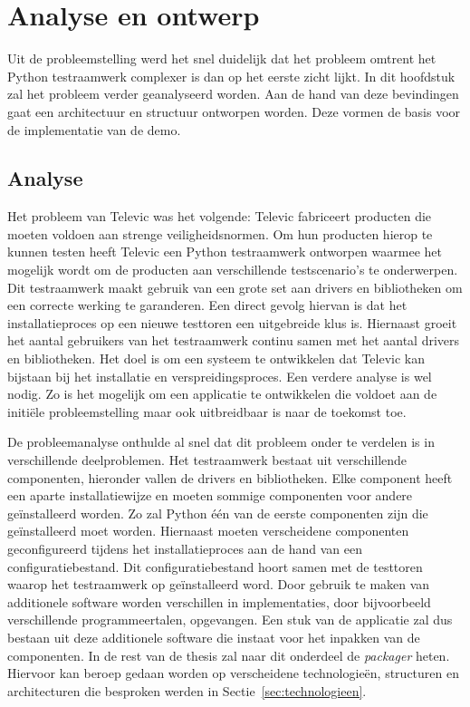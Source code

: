 \chapter{Analyse en ontwerp}
Uit de probleemstelling werd het snel duidelijk dat het probleem omtrent het Python testraamwerk complexer is dan op het eerste zicht lijkt.
In dit hoofdstuk zal het probleem verder geanalyseerd worden.
Aan de hand van deze bevindingen gaat een architectuur en structuur ontworpen worden.
Deze vormen de basis voor de implementatie van de demo.

\section{Analyse}
Het probleem van Televic was het volgende:
Televic fabriceert producten die moeten voldoen aan strenge veiligheidsnormen.
Om hun producten hierop te kunnen testen heeft Televic een Python testraamwerk ontworpen waarmee het mogelijk wordt om de producten aan verschillende testscenario's te onderwerpen.
Dit testraamwerk maakt gebruik van een grote set aan drivers en bibliotheken om een correcte werking te garanderen.
Een direct gevolg hiervan is dat het installatieproces op een nieuwe testtoren een uitgebreide klus is.
Hiernaast groeit het aantal gebruikers van het testraamwerk continu samen met het aantal drivers en bibliotheken.
Het doel is om een systeem te ontwikkelen dat Televic kan bijstaan bij het installatie en verspreidingsproces.
Een verdere analyse is wel nodig.
Zo is het mogelijk om een applicatie te ontwikkelen die voldoet aan de initiële probleemstelling maar ook uitbreidbaar is naar de toekomst toe.

De probleemanalyse onthulde al snel dat dit probleem onder te verdelen is in verschillende deelproblemen.
Het testraamwerk bestaat uit verschillende componenten, hieronder vallen de drivers en bibliotheken.
Elke component heeft een aparte installatiewijze en moeten sommige componenten voor andere geïnstalleerd worden.
Zo zal Python één van de eerste componenten zijn die geïnstalleerd moet worden.
Hiernaast moeten verscheidene componenten geconfigureerd tijdens het installatieproces aan de hand van een configuratiebestand.
Dit configuratiebestand hoort samen met de testtoren waarop het testraamwerk op geïnstalleerd word.
Door gebruik te maken van additionele software worden verschillen in implementaties, door bijvoorbeeld verschillende programmeertalen, opgevangen.
Een stuk van de applicatie zal dus bestaan uit deze additionele software die instaat voor het inpakken van de componenten.
In de rest van de thesis zal naar dit onderdeel de \emph{packager} heten.
Hiervoor kan beroep gedaan worden op verscheidene technologieën, structuren en architecturen die besproken werden in Sectie~\vref{sec:technologieen}.

